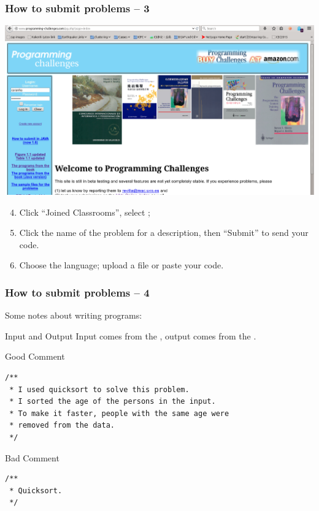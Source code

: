 \documentclass{beamer}
\begin{document}
\begin{frame}
  \frametitle{How to submit problems -- 3}

  \begin{center}
    \includegraphics[height=0.4\textheight]{pcwebsite}
  \end{center}

  \begin{enumerate}
    \setcounter{enumi}{3}
  \item Click ``Joined Classrooms'', select
    ;
  \item Click the name of the problem for a description, then ``Submit'' to send your code.
  \item Choose the language; upload a file or paste your code.
  \end{enumerate}
\end{frame}

\begin{frame}
  \frametitle{How to submit problems -- 4}

  Some notes about writing programs:
  
  \begin{block}{Input and Output}
    Input comes from the , output comes from the .
  \end{block}

  \begin{exampleblock}{Good Comment}
    {\smaller
\begin{verbatim}
/**
 * I used quicksort to solve this problem. 
 * I sorted the age of the persons in the input.
 * To make it faster, people with the same age were 
 * removed from the data.
 */
\end{verbatim}}
  \end{exampleblock}
  \begin{alertblock}{Bad Comment}
{\smaller
\begin{verbatim}
/**
 * Quicksort.
 */
\end{verbatim}}
  \end{alertblock}
\end{frame}
\end{document}
